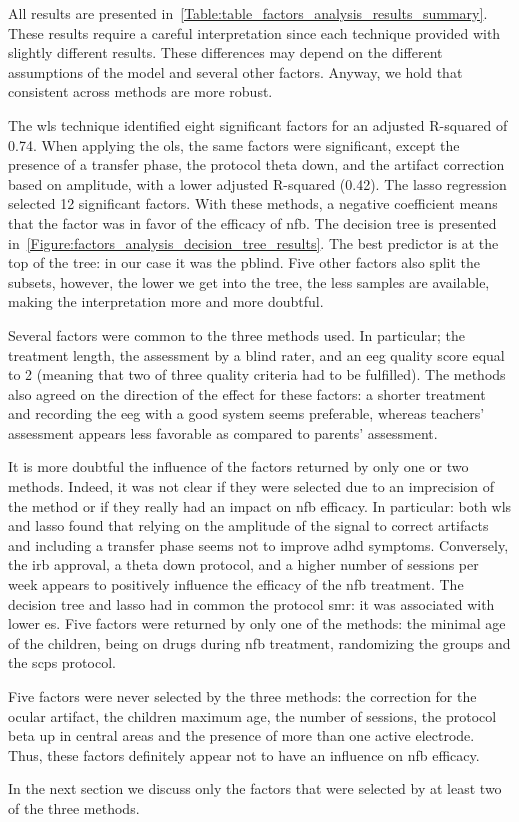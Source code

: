 All results are presented in~\cref{Table:table_factors_analysis_results_summary}. These results require a 
careful interpretation since each technique provided with slightly different results. These differences 
may depend on the different assumptions of the model and several other factors. Anyway, 
we hold that consistent across methods are more robust.

The \gls{wls} technique identified eight significant factors for an adjusted R-squared of 0.74. 
When applying the \gls{ols}, the same factors were significant, except the presence of 
a transfer phase, the protocol theta down, and the artifact correction based on amplitude, with a lower adjusted R-squared 
(0.42). The \gls{lasso} regression selected 12 significant factors.  With these methods, a negative coefficient means 
that the factor was in favor  of the efficacy of \gls{nfb}. The decision tree is presented in~\cref{Figure:factors_analysis_decision_tree_results}. 
The best predictor is at the top of the tree: in our case it was 
the \gls{pblind}. Five other factors also split the subsets, however, the lower we get into the tree, the less samples are 
available, making the interpretation more and more doubtful.  

Several factors were common to the three methods used. In particular; the treatment length, the assessment 
by a blind rater, and an \gls{eeg} quality score equal to 2 (meaning that two of three quality criteria had to be fulfilled). 
The methods also agreed on the direction of the effect for these factors: 
a shorter treatment and recording the \gls{eeg} with a good system seems preferable, whereas teachers' assessment appears less favorable
as compared to parents' assessment.

It is more doubtful the influence of the factors returned by only one or two methods. Indeed, it was not clear 
if they were selected due to an imprecision of the method or if they really had an impact on \gls{nfb} efficacy. In particular: 
both \gls{wls} and \gls{lasso} found that relying on the amplitude of the signal to correct artifacts and including a transfer 
phase seems not to improve \gls{adhd} symptoms. Conversely, the \gls{irb} approval, a theta down protocol, and a higher number 
of sessions per week appears to positively influence the efficacy of the \gls{nfb} treatment. The decision tree and \gls{lasso} had in common the protocol 
\gls{smr}: it was associated with lower \gls{es}. Five factors were returned by only one of the methods: the minimal age of the 
children, being on drugs during \gls{nfb} treatment, randomizing the groups and the \glspl{scp} protocol.  

Five factors were never selected by the three methods: the correction for the ocular artifact, the children maximum age, the number 
of sessions, the protocol beta up in central areas and the presence of more than one active electrode. Thus, these factors definitely appear 
not to have an influence on \gls{nfb} efficacy.  

In the next section we discuss only the factors that were selected by at least two of the three methods. 


